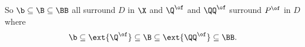 So $\b\subseteq \B\subseteq \BB$ all surround $D$ in $\X$ and $\Q^\of$ and $\QQ^\of$ surround $P^\of$ in $D$ where
\[ \b\subseteq \ext{\Q^\of}\subseteq \B\subseteq \ext{\QQ^\of}\subseteq \BB.\]
%
%

